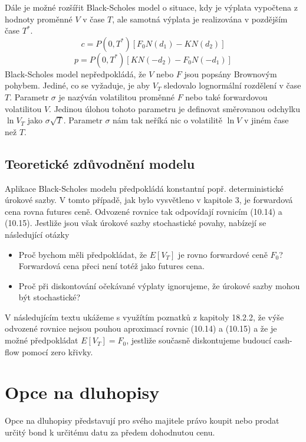 \documentclass[a4paper]{book}
\begin{document}
Dále je možné rozšířit Black-Scholes model o situace, kdy je výplata vypočtena z hodnoty proměnné $V$ v čase $T$, ale samotná výplata je realizována v pozdějším čase $T^*$.
\begin{equation*}
c = P(0,T^*)[F_0N(d_1)-KN(d_2)]
\end{equation*}
\begin{equation*}
p = P(0,T^*)[KN(-d_2)-F_0N(-d_1)]
\end{equation*}
Black-Scholes model nepředpokládá, že $V$ nebo $F$ jsou popsány Brownovým pohybem. Jediné, co se vyžaduje, je aby $V_T$ sledovalo lognormální rozdělení v čase $T$. Parametr $\sigma$ je nazýván volatilitou proměnné $F$ nebo také forwardovou volatilitou $V$. Jedinou úlohou tohoto parametru je definovat směrovanou odchylku $\ln V_T$ jako $\sigma \sqrt{T}$. Parametr $\sigma$ nám tak neříká nic o volatilitě $\ln V$ v jiném čase než $T$. 

\subsection{Teoretické zdůvodnění modelu}

Aplikace Black-Scholes modelu předpokládá konstantní popř. deterministické úrokové sazby. V tomto případě, jak bylo vysvětleno v kapitole 3, je forwardová cena rovna futures ceně. Odvozené rovnice tak odpovídají rovnicím (10.14) a (10.15). Jestliže jsou však úrokové sazby stochastické povahy, nabízejí se následující otázky
\begin{itemize}
\item Proč bychom měli předpokládat, že $E[V_T]$ je rovno forwardové ceně $F_0$? Forwardová cena přeci není totéž jako futures cena.
\item Proč při diskontování očekávané výplaty ignorujeme, že úrokové sazby mohou být stochastické?
\end{itemize}
V následujícím textu ukážeme s využítím poznatků z kapitoly 18.2.2, že výše odvozené rovnice nejsou pouhou aproximací rovnic (10.14) a (10.15) a že je možné předpokládat $E[V_T] = F_0$, jestliže současně diskontujeme budoucí cash-flow pomocí zero křivky.

\section{Opce na dluhopisy}

Opce na dluhopisy představují pro svého majitele právo koupit nebo prodat určitý bond k určitému datu za předem dohodnutou cenu.
\end{document}
